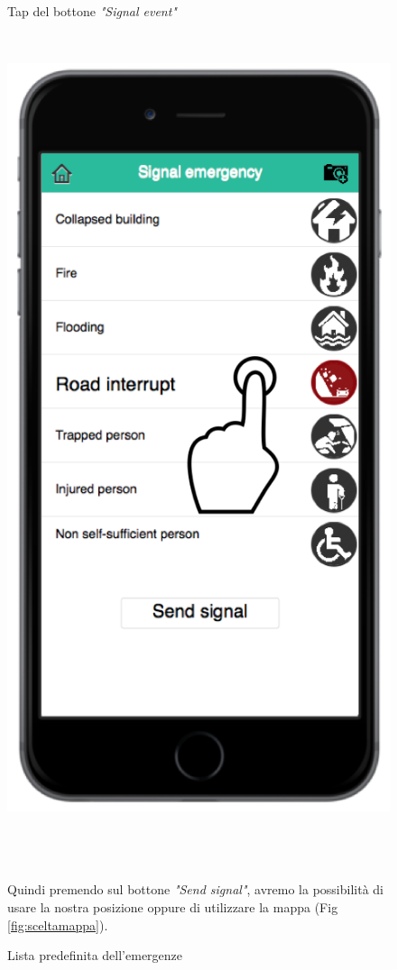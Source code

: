 \begin{figure}
\begin{minipage}[b]{6cm}
	\caption{Tap del bottone \textit{"Signal event"}}
	\label{fig:buttonsegnala}
 \end{minipage}
 \ \hspace{6 mm} \hspace{7 mm} \
 \begin{minipage}[b]{6cm}
\includegraphics[scale=0.9]{interfaccia/segnalatap.png}
	\caption{Lista predefinita dell'emergenze}
	\label{fig:lista-em}
	
 \end{minipage}
 \\ \\ \\
Quindi premendo sul bottone \textit{"Send signal"}, avremo la possibilità di usare la nostra posizione oppure di utilizzare la mappa (Fig \ref{fig:sceltamappa}).
\end{figure}




